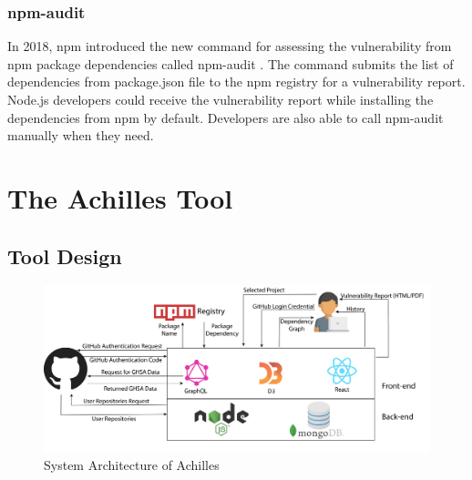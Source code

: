 \documentclass[conference]{IEEEtran}
\begin{document}
	\subsubsection{npm-audit}
	    In 2018, npm introduced the new command for assessing the vulnerability from npm package dependencies called npm-audit \citep{webnpm-audit}.
	    The command submits the list of dependencies from package.json file to the npm registry for a vulnerability report.
	    Node.js developers could receive the vulnerability report while installing the dependencies from npm by default.
	    Developers are also able to call npm-audit manually when they need.
	
	\section{The Achilles Tool}
	\subsection{Tool Design}
	\begin{figure}[tb]
		\centering
		\includegraphics[width=\columnwidth]{Figures/SystemArch.png}
		\caption{System Architecture of Achilles}
		\label{fig:system_architecture}
	\end{figure}
	
\end{document}
